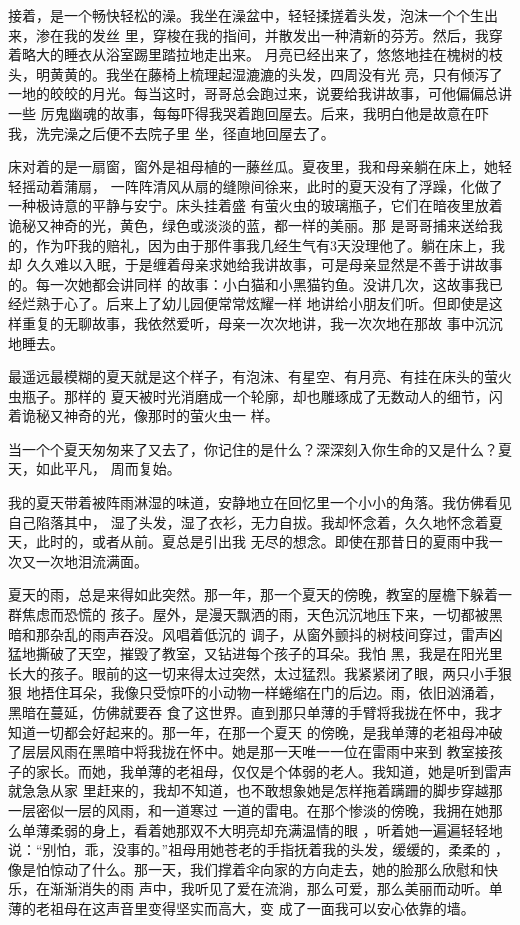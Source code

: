 \documentclass[12pt,a4paper]{article}
\begin{document}
		接着，是一个畅快轻松的澡。我坐在澡盆中，轻轻揉搓着头发，泡沫一个个生出来，渗在我的发丝
	里，穿梭在我的指间，并散发出一种清新的芬芳。然后，我穿着略大的睡衣从浴室踢里踏拉地走出来。
	月亮已经出来了，悠悠地挂在槐树的枝头，明黄黄的。我坐在藤椅上梳理起湿漉漉的头发，四周没有光
	亮，只有倾泻了一地的皎皎的月光。每当这时，哥哥总会跑过来，说要给我讲故事，可他偏偏总讲一些
	厉鬼幽魂的故事，每每吓得我哭着跑回屋去。后来，我明白他是故意在吓我，洗完澡之后便不去院子里
	坐，径直地回屋去了。

		床对着的是一扇窗，窗外是祖母植的一藤丝瓜。夏夜里，我和母亲躺在床上，她轻轻摇动着蒲扇，
	一阵阵清风从扇的缝隙间徐来，此时的夏天没有了浮躁，化做了一种极诗意的平静与安宁。床头挂着盛
	有萤火虫的玻璃瓶子，它们在暗夜里放着诡秘又神奇的光，黄色，绿色或淡淡的蓝，都一样的美丽。那
	是哥哥捕来送给我的，作为吓我的赔礼，因为由于那件事我几经生气有3天没理他了。躺在床上，我却
	久久难以入眠，于是缠着母亲求她给我讲故事，可是母亲显然是不善于讲故事的。每一次她都会讲同样
	的故事：小白猫和小黑猫钓鱼。没讲几次，这故事我已经烂熟于心了。后来上了幼儿园便常常炫耀一样
	地讲给小朋友们听。但即使是这样重复的无聊故事，我依然爱听，母亲一次次地讲，我一次次地在那故
	事中沉沉地睡去。

		最遥远最模糊的夏天就是这个样子，有泡沫、有星空、有月亮、有挂在床头的萤火虫瓶子。那样的
	夏天被时光消磨成一个轮廓，却也雕琢成了无数动人的细节，闪着诡秘又神奇的光，像那时的萤火虫一
	样。

	\endwriting



		当一个个夏天匆匆来了又去了，你记住的是什么？深深刻入你生命的又是什么？夏天，如此平凡，
	周而复始。

		我的夏天带着被阵雨淋湿的味道，安静地立在回忆里一个小小的角落。我仿佛看见自己陷落其中，
	湿了头发，湿了衣衫，无力自拔。我却怀念着，久久地怀念着夏天，此时的，或者从前。夏总是引出我
	无尽的想念。即使在那昔日的夏雨中我一次又一次地泪流满面。

		夏天的雨，总是来得如此突然。那一年，那一个夏天的傍晚，教室的屋檐下躲着一群焦虑而恐慌的
	孩子。屋外，是漫天飘洒的雨，天色沉沉地压下来，一切都被黑暗和那杂乱的雨声吞没。风唱着低沉的
	调子，从窗外颤抖的树枝间穿过，雷声凶猛地撕破了天空，摧毁了教室，又钻进每个孩子的耳朵。我怕
	黑，我是在阳光里长大的孩子。眼前的这一切来得太过突然，太过猛烈。我紧紧闭了眼，两只小手狠狠
	地捂住耳朵，我像只受惊吓的小动物一样蜷缩在门的后边。雨，依旧汹涌着，黑暗在蔓延，仿佛就要吞
	食了这世界。直到那只单薄的手臂将我拢在怀中，我才知道一切都会好起来的。那一年，在那一个夏天
	的傍晚，是我单薄的老祖母冲破了层层风雨在黑暗中将我拢在怀中。她是那一天唯一一位在雷雨中来到
	教室接孩子的家长。而她，我单薄的老祖母，仅仅是个体弱的老人。我知道，她是听到雷声就急急从家
	里赶来的，我却不知道，也不敢想象她是怎样拖着蹒跚的脚步穿越那一层密似一层的风雨，和一道寒过
	一道的雷电。在那个惨淡的傍晚，我拥在她那么单薄柔弱的身上，看着她那双不大明亮却充满温情的眼
	，听着她一遍遍轻轻地说：“别怕，乖，没事的。”祖母用她苍老的手指抚着我的头发，缓缓的，柔柔的
	，像是怕惊动了什么。那一天，我们撑着伞向家的方向走去，她的脸那么欣慰和快乐，在渐渐消失的雨
	声中，我听见了爱在流淌，那么可爱，那么美丽而动听。单薄的老祖母在这声音里变得坚实而高大，变
	成了一面我可以安心依靠的墙。
\end{document}
